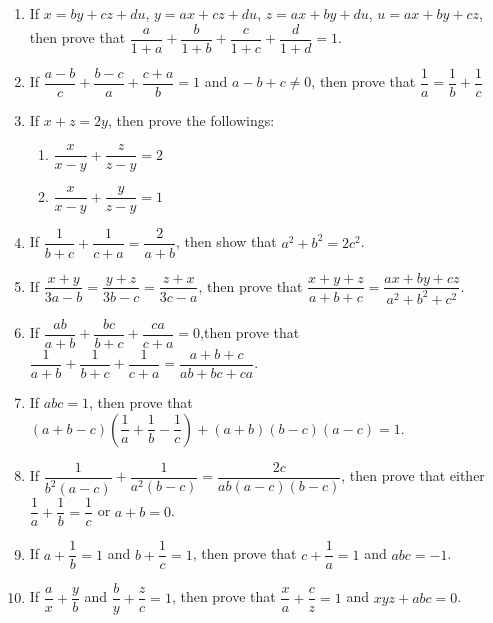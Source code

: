 \begin{enumerate}
                \begin{enumerate}[label=(\alph*)]
                    \item $\dfrac{1}{a^3}+\dfrac{1}{b^3}+\dfrac{1}{c^3}= \dfrac{1}{a^3+b^3+c^3}=\dfrac{1}{(a+b+c)^3}$
                    \item $\dfrac{1}{a^5}+\dfrac{1}{b^5}+\dfrac{1}{c^5}= \dfrac{1}{a^5+b^5+c^5}=\dfrac{1}{(a+b+c)^5}$
                    \item $\dfrac{1}{a^7}+\dfrac{1}{b^7}+\dfrac{1}{c^7}= \dfrac{1}{a^7+b^7+c^7}=\dfrac{1}{(a+b+c)^7}$
                \end{enumerate}
            \item If $x=by+cz+du$, $y=ax+cz+du$, $z=ax+by+du$, $u=ax+by+cz$, then prove that $\dfrac{a}{1+a}+\dfrac{b}{1+b}+\dfrac{c}{1+c}+\dfrac{d}{1+d}=1$.
            \item If $\dfrac{a-b}{c}+\dfrac{b-c}{a}+\dfrac{c+a}{b}=1$ and $a-b+c\neq0$, then prove that $\dfrac{1}{a}=\dfrac{1}{b}+\dfrac{1}{c}$


            \item If $x+z=2y$, then prove the followings:
                \begin{enumerate}[label=(\alph*)]
                    \item $\dfrac{x}{x-y}+\dfrac{z}{z-y}=2$
                    \item $\dfrac{x}{x-y}+\dfrac{y}{z-y}=1$
                \end{enumerate}
            \item If $\dfrac{1}{b+c}+\dfrac{1}{c+a}=\dfrac{2}{a+b}$, then show that $a^2+b^2=2c^2$.
            \item If $\dfrac{x+y}{3a-b}=\dfrac{y+z}{3b-c}=\dfrac{z+x}{3c-a}$, then prove that $\dfrac{x+y+z}{a+b+c}=\dfrac{ax+by+cz}{a^2+b^2+c^2}$.
            \item If $\dfrac{ab}{a+b}+\dfrac{bc}{b+c}+\dfrac{ca}{c+a}=0$,then prove that $\dfrac{1}{a+b}+\dfrac{1}{b+c}+\dfrac{1}{c+a}=\dfrac{a+b+c}{ab+bc+ca}$.
            \item If $abc=1$, then prove that $(a+b-c)\left(\dfrac{1}{a}+\dfrac{1}{b}-\dfrac{1}{c}\right)+(a+b)(b-c)(a-c)=1$.
            \item If $\dfrac{1}{b^2(a-c)}+\dfrac{1}{a^2(b-c)}=\dfrac{2c}{ab(a-c)(b-c)}$, then prove that either $\dfrac{1}{a}+\dfrac{1}{b}=\dfrac{1}{c}$ or $a+b=0$.
            \item If $a+\dfrac{1}{b}=1$ and $b+\dfrac{1}{c}=1$, then prove that $c+\dfrac{1}{a}=1$ and $abc=-1$.
            \item If $\dfrac{a}{x}+\dfrac{y}{b}$ and $\dfrac{b}{y}+\dfrac{z}{c}=1$, then prove that $\dfrac{x}{a}+\dfrac{c}{z}=1$ and $xyz+abc=0$.
            

\end{enumerate}
